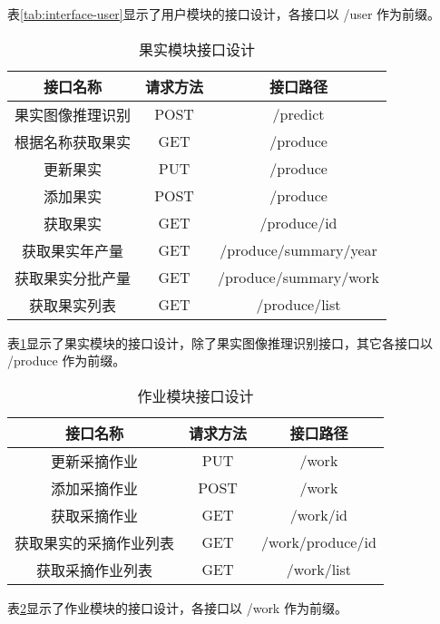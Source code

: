 表\ref{tab:interface-user}显示了用户模块的接口设计，各接口以 /user 作为前缀。

\begin{table}[H]
\centering
\caption{果实模块接口设计}
\label{tab:interface-produce}
\begin{tabular}{|c|c|c|}
\hline
接口名称 & 请求方法 & 接口路径 \\ \hline
果实图像推理识别 & POST & /predict \\ \hline
根据名称获取果实 & GET & /produce \\ \hline
更新果实 & PUT & /produce \\ \hline
添加果实 & POST & /produce \\ \hline
获取果实 & GET & /produce/{id} \\ \hline
获取果实年产量 & GET & /produce/summary/year \\ \hline
获取果实分批产量 & GET & /produce/summary/work \\ \hline
获取果实列表 & GET & /produce/list \\ \hline
\end{tabular}
\end{table}

表\ref{tab:interface-produce}显示了果实模块的接口设计，除了果实图像推理识别接口，其它各接口以 /produce 作为前缀。

\begin{table}[H]
\centering
\caption{作业模块接口设计}
\label{tab:interface-work}
\begin{tabular}{|c|c|c|}
\hline
接口名称 & 请求方法 & 接口路径 \\ \hline
更新采摘作业 & PUT & /work \\ \hline
添加采摘作业 & POST & /work \\ \hline
获取采摘作业 & GET & /work/{id} \\ \hline
获取果实的采摘作业列表 & GET & /work/produce/{id}\\ \hline
获取采摘作业列表 & GET & /work/list \\ \hline
\end{tabular}
\end{table}

表\ref{tab:interface-work}显示了作业模块的接口设计，各接口以 /work 作为前缀。

